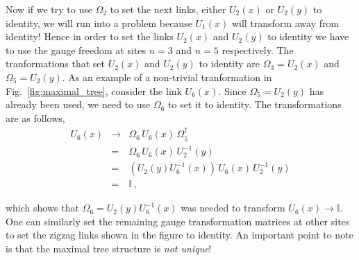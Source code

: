 \documentclass[11pt]{article}
\theoremstyle{definition}
\begin{document}
Now if we try to use $\Omega_2$ to set the next links, either $U_2(x)$ or $U_2(y)$ to identity, we will run into a problem because $U_1(x)$ will transform away from identity! Hence in order to set the links $U_2(x)$ and $U_2(y)$ to identity we have to use the gauge freedom at sites $n = 3$ and $n = 5$ respectively. The tranformations that set $U_2(x)$ and $U_2(y)$ to identity are $\Omega_3 = U_2(x)$ and $\Omega_5 = U_2(y)$. As an example of a non-trivial tranformation in Fig.~\ref{fig:maximal_tree}, consider the link $U_6(x)$. Since $\Omega_5 = U_2(y)$ has already been used, we need to use $\Omega_6$ to set it to identity. The transformations are as follows,
\begin{eqnarray*}
U_6(x) &\to& \Omega_6 \, U_6(x) \, \Omega_5^{\dagger} \\
&=& \Omega_6 \, U_6(x) \, U^{-1}_2(y) \\
&=& \left(U_2(y) U^{-1}_6(x)\right) \, U_6(x) \, U^{-1}_2(y) \\
&=& \mathbb{I}\,,
\end{eqnarray*}

which shows that $\Omega_6 = U_2(y) U^{-1}_6(x)$ was needed to transform $U_6(x) \to \mathbb{I}$. One can similarly set the remaining gauge transformation matrices at other sites to set the zigzag links shown in the figure to identity. An important point to note is that the maximal tree structure is \textit{not unique}! 
\end{document}
